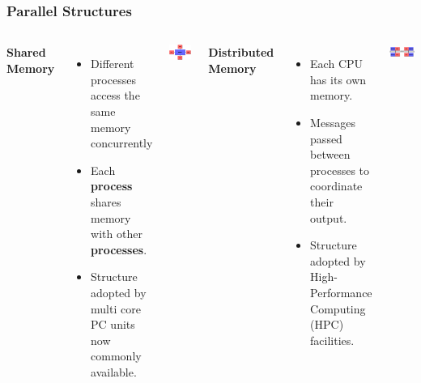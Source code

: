 \documentclass{beamer}
\begin{document}
\begin{frame}
\frametitle{Parallel Structures}
\fontsize{8pt}{7.2}
\begin{columns}[t] %

\textbf{Shared Memory}
\begin{itemize}
\item Different processes access the same memory concurrently
\item Each \textbf{process} shares memory with other \textbf{processes}.
\item Structure adopted by multi core PC units now commonly available.
\end{itemize}
\includegraphics[width =\textwidth]{shared_mem.jpg}

\textbf{Distributed Memory}
\begin{itemize}
\item Each CPU has its own memory.
\item Messages passed between processes to coordinate their output.
\item Structure adopted by High-Performance Computing (HPC) facilities.
\end{itemize}
\includegraphics[width =\textwidth]{dist_mem.png}


\end{columns}
\end{frame}
\end{document}
